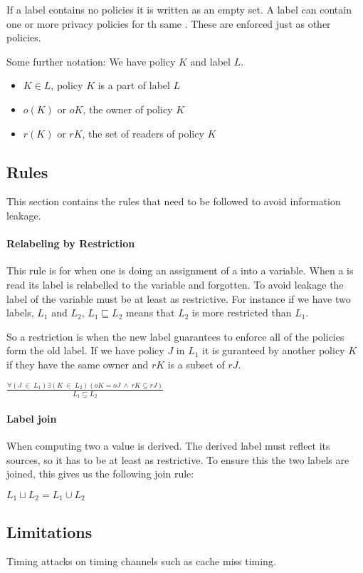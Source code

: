 If a label contains no policies it is written as an empty set.
A label can contain one or more privacy policies for th same \principal{}.
These are enforced just as other policies.


Some further notation:
We have policy $K$ and label $L$.
\begin{itemize}
\item $K \in L$, policy $K$ is a part of label $L$
\item $o(K)$ or $oK$, the owner of policy $K$
\item $r(K)$ or $rK$, the set of readers of policy $K$
\end{itemize}

\subsection{Rules}
This section contains the rules that need to be followed to avoid information leakage.

\paragraph{Relabeling by Restriction}
This rule is for when one is doing an assignment of a \xvalue{} into a variable.
When a \xvalue{} is read its label is relabelled to the variable and forgotten.
To avoid leakage the label of the variable must be at least as restrictive.
For instance if we have two labels, $L_1$ and $L_2$, $L_1 \sqsubseteq L_2$ means that $L_2$ is more restricted than $L_1$.

So a restriction is when the new label guarantees to enforce all of the policies form the old label.
If we have policy $J$ in $L_1$ it is guranteed by another policy $K$ if they have the same owner and $rK$ is a subset of $rJ$.
\begin{center}
$\frac{\forall (J \ \in \ L_1) \exists (K \ \in \ L_2)(oK = oJ \ \wedge \ rK \subseteq rJ)}{L_1 \sqsubseteq L_2}$
\end{center}

\paragraph{Label join}
When computing two \xvalues a value is derived.
The derived \xvalues label must reflect its sources, so it has to be at least as restrictive.
To ensure this the two labels are joined, this gives us the following join rule:
\begin{center}
  $L_1 \sqcup L_2 = L_1 \cup L_2$
\end{center}

\subsection{Limitations}
Timing attacks on timing channels such as cache miss timing.
